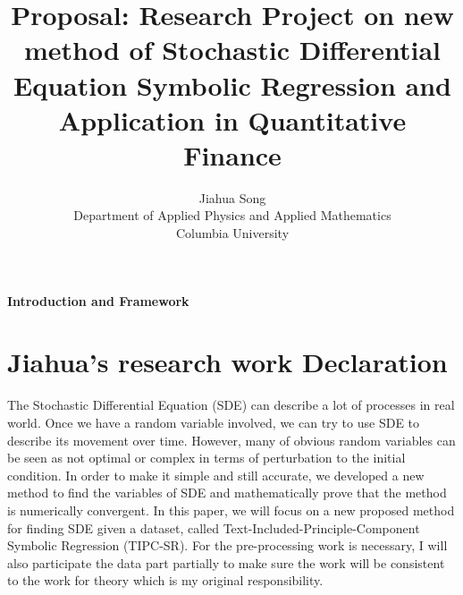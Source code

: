 \documentclass[12pt]{article}
\title{Proposal: Research Project on new method of Stochastic Differential Equation Symbolic Regression and Application in Quantitative Finance}
\author{Jiahua Song\\
  Department of Applied Physics and Applied Mathematics\\
  Columbia University
}
\begin{document}
\maketitle

\paragraph{Introduction and Framework}
\section{Jiahua's research work Declaration}
The Stochastic Differential Equation (SDE) can describe a lot of processes in real world. Once we have a random variable involved, we can try to use SDE to describe its movement over time. However, many of obvious random variables can be seen as not optimal or complex in terms of perturbation to the initial condition. In order to make it simple and still accurate, we developed a new method to find the variables of SDE and mathematically prove that the method is numerically convergent. In this paper, we will focus on a new proposed method for finding SDE given a dataset, called Text-Included-Principle-Component Symbolic Regression (TIPC-SR). For the pre-processing work is necessary, I will also participate the data part partially to make sure the work will be consistent to the work for theory which is my original responsibility. 
\end{document}
